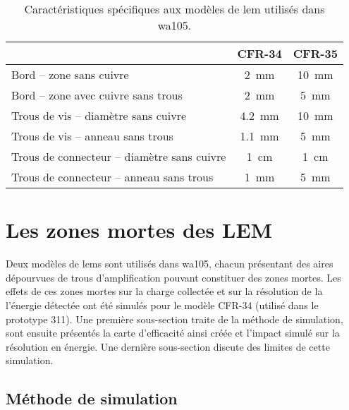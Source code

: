             \begin{table}\label{tab::lem-diff}
                \centering
                \begin{tabular}{|l|c|c|}
                    \hline
                     & CFR-34 & CFR-35\\
                    \hline
                    Bord -- zone sans cuivre & \SI{2}{\milli\meter} & \SI{10}{\milli\meter}\\
                    Bord -- zone avec cuivre sans trous & \SI{2}{\milli\meter} & \SI{5}{\milli\meter}\\
                    Trous de vis -- diamètre sans cuivre & \SI{4.2}{\milli\meter} & \SI{10}{\milli\meter} \\
                    Trous de vis -- anneau sans trous &  \SI{1.1}{\milli\meter} & \SI{5}{\milli\meter} \\
                    Trous de connecteur -- diamètre sans cuivre & \SI{1}{\centi\meter} & \SI{1}{\centi\meter} \\
                    Trous de connecteur -- anneau sans trous & \SI{1}{\milli\meter} & \SI{5}{\milli\meter} \\
                    \hline
                \end{tabular}
                \caption{Caractéristiques spécifiques aux modèles de \gls{lem} utilisés dans \gls{wa105}.}
            \end{table}
            
        
    \section{Les zones mortes des LEM}\label{sec::zones_mortes}
    
        Deux modèles de \glspl{lem} sont utilisés dans \gls{wa105}, chacun présentant des aires dépourvues de trous d'amplification pouvant constituer des zones mortes. Les effets de ces zones mortes sur la charge collectée et sur la résolution de la l'énergie détectée ont été simulés pour le modèle CFR-34 (utilisé dans le prototype 311). Une première sous-section traite de la méthode de simulation, sont ensuite présentés la carte d'efficacité ainsi créée et l'impact simulé sur la résolution en énergie. Une dernière sous-section discute des limites de cette simulation.
        
        \subsection{Méthode de simulation}
        
